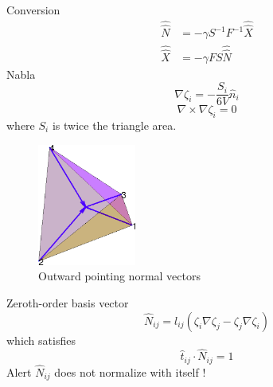 \documentclass[a4paper,onecolumn]{article}
\begin{document}
Conversion
\begin{equation*}\begin{split}
    \hat{\hat{N}} &= -\gamma S^{-1}F^{-1}\hat{\hat{X}}\\
    \hat{\hat{X}} & = -\gamma FS\hat{\hat{N}}
\end{split}\end{equation*}
Nabla
$$
    \nabla \zeta_i = - \frac{S_i}{6 V} \hat{n}_i
$$
$$
    \nabla\times\nabla \zeta_i = 0
$$
where $S_i$ is twice the triangle area.
\begin{figure}\begin{center}
    \includegraphics[height=4cm]{normalvectors.png}
    \caption{Outward pointing normal vectors}
\end{center}\end{figure}


\noindent Zeroth-order basis vector
$$
    \hat{N}_{ij} = l_{ij} \left( \zeta_{i}\nabla \zeta_{j} - \zeta_{j} \nabla \zeta_{i} \right)
$$
which satisfies
$$
    \hat{t}_{ij}\cdot \hat{N}_{ij} = 1
$$
Alert $\hat{N}_{ij}$ does not normalize with itself !
\end{document}
